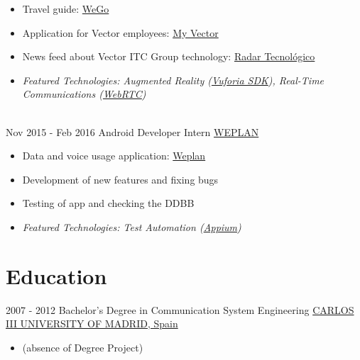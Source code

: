 \documentclass[letterpaper]{twentysecondcv} %
\begin{document}
\begin{twenty}
{{\begin{itemize}
        \item Travel guide: \href{https://play.google.com/store/apps/details?id=com.wego.bcn&hl=es}{WeGo}
        \item Application for Vector employees:
		\href{https://play.google.com/store/apps/details?id=com.vectormobile.myvector&hl=es}{My Vector}
		\item News feed about Vector ITC Group technology:
		\href{https://play.google.com/store/apps/details?id=com.vectormobile.trends&hl=es}{Radar Tecnológico}
		\item \textit{Featured Technologies: {Augmented Reality (\href{https://www.vuforia.com/}{Vuforia SDK})}, Real-Time Communications (\href{https://webrtc.org/}{WebRTC})}
    \end{itemize}}
        }
     \\
     \twentyitem
   		{Nov 2015 -}
		{Feb 2016}
        {Android Developer Intern}
        {\href{http://weplan-app.com/}{WEPLAN}}
        {}
        {
        \begin{itemize}
        \item Data and voice usage application: \href{https://play.google.com/store/apps/details?id=com.cumberland.tutarifa&hl=en}{Weplan}
        \item Development of new features and fixing bugs
        \item Testing of app and checking the DDBB
        \item \textit{Featured Technologies: Test Automation (\href{https://play.google.com/store/apps/details?id=com.cumberland.tutarifa&hl=en}{Appium})} 
    \end{itemize}
    	}
        
\end{twenty}

\section{Education}

\begin{twenty} %
	\twentyitem
    	{2007 - 2012}
        {}
        {Bachelor's Degree in Communication System Engineering}
        \newline
       {\href{https://www.uc3m.es/Home}{CARLOS III UNIVERSITY OF MADRID, Spain}}
       {\begin{itemize}
       \item (absence of Degree Project)
       \end{itemize}}
        {}
        {}
\end{twenty}
\end{document}
